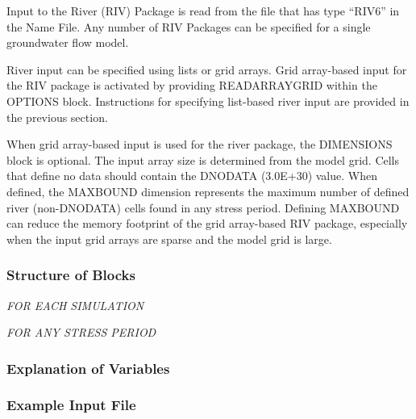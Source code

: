 Input to the River (RIV) Package is read from the file that has type ``RIV6'' in the Name File.  Any number of RIV Packages can be specified for a single groundwater flow model.

River input can be specified using lists or grid arrays.  Grid array-based input for the RIV package is activated by providing READARRAYGRID within the OPTIONS block.  Instructions for specifying list-based river input are provided in the previous section.

When grid array-based input is used for the river package, the DIMENSIONS block is optional.  The input array size is determined from the model grid.  Cells that define no data should contain the DNODATA (3.0E+30) value.  When defined, the MAXBOUND dimension represents the maximum number of defined river (non-DNODATA) cells found in any stress period.  Defining MAXBOUND can reduce the memory footprint of the grid array-based RIV package, especially when the input grid arrays are sparse and the model grid is large.

\vspace{5mm}
\subsubsection{Structure of Blocks}
\vspace{5mm}

\noindent \textit{FOR EACH SIMULATION}


\vspace{5mm}
\noindent \textit{FOR ANY STRESS PERIOD}


\vspace{5mm}
\subsubsection{Explanation of Variables}
\begin{description}

\end{description}

\vspace{5mm}
\subsubsection{Example Input File}


